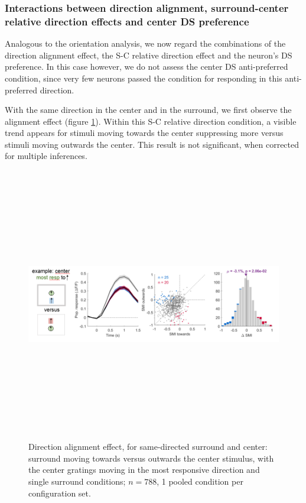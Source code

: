 \subsubsection{Interactions between direction alignment, surround-center relative direction effects and center DS preference}

Analogous to the orientation analysis, we now regard the combinations of the direction alignment effect, the S-C relative direction effect and the neuron's DS preference. In this case however, we do not assess the center DS anti-preferred condition, since very few neurons passed the condition for responding in this anti-preferred direction.

With the same direction in the center and in the surround, we first observe the alignment effect (figure \ref{19}). Within this S-C relative direction condition, a visible trend appears for stimuli moving towards the center suppressing more versus stimuli moving outwards the center. This result  is not significant, when corrected for multiple inferences.

\begin{figure}[H] \centering \includegraphics[width=12cm,height=12cm,keepaspectratio]{Figures/7.Results/finalPopulation/sel/diagrams/19.png} 
\caption{Direction alignment effect, for same-directed surround and center: surround moving towards versus outwards the center stimulus, with the center gratings moving in the most responsive direction and single surround conditions;  $n=788$, 1 pooled condition per configuration set.} \label{19}
\end{figure}


